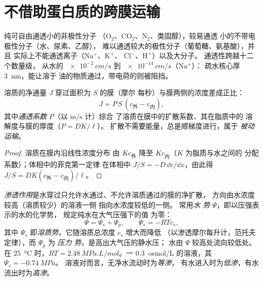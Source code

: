 \section{不借助蛋白质的跨膜运输}

\begin{proposition}[双层的通透性]\label{prop:b1:membranes-transport:permeability}
纯可自由通透小的非极性分子
（$\mathrm{O_2}$、$\mathrm{CO_2}$、$\mathrm{N_2}$、类固醇），较易通透
小的不带电极性分子（水、尿素、乙醇），
难以通透较大的极性分子（葡萄糖、氨基酸），并且
实际上不能通透离子（$\mathrm{Na^+}$、$\mathrm{K^+}$、
$\mathrm{Cl^-}$、$\mathrm{H^+}$）以及大分子。
通透性跨越十二个数量级，
从水的 $\qty{e-2}{cm/s}$ 到 $\qty{e-14}{cm/s}$（$\mathrm{Na^+}$）：
疏水核心厚 \qty{3}{nm}，能让溶于
油的物质通过，带电荷的则被阻挡。
\end{proposition}

\begin{theorem}[扩散的菲克定律]\label{thm:b1:membranes-transport:fick}
溶质的净通量 $J$ 穿过面积为 $S$ 的膜（摩尔
每秒）与膜两侧的浓度差成正比：
\[
J = P\,S\,(c_{\text{外}} - c_{\text{内}}),
\]
其中\emph{通透系数} $P$（以 \unit{m/s} 计）综合
了溶质在膜中的扩散系数、其在脂质中的
溶解度与膜的厚度（$P = DK/\ell$）。
扩散不需要能量，总是顺梯度进行，属于
\emph{被动运输}。
\end{theorem}
\begin{proof}
溶质在膜内沿线性浓度分布
由 $Kc_{\text{外}}$ 降至 $Kc_{\text{内}}$（$K$ 为脂质与水之间的
分配系数）；体相中的菲克第一定律
在体相中 $J/S = -D\,\dd c/\dd x$，由此得 $J/S = DK(c_{\text{外}} -
c_{\text{内}})/\ell$。
\end{proof}

\begin{definition}[渗透作用，水势]\label{def:b1:membranes-transport:osmosis}
\emph{渗透作用}是水穿过只允许水通过、不允许溶质通过的膜的净扩散，
方向由水浓度较高（溶质较少）的溶液一侧
指向水浓度较低的一侧。
常用\emph{水
势} $\Psi$，即以压强表示的水的化学势，
规定纯水在大气压强下的值
为零：
\[
\Psi = \Psi_s + \Psi_p, \qquad \Psi_s = -RTc_s ,
\]
其中 $\Psi_s$ 即\emph{溶质势}，它随溶质总浓度 $c_s$ 增大而降低
（以渗透摩尔每升计，范托夫定律），而 $\Psi_p$ 为
\emph{压力
势}，是高出大气压的静水压；
水由 $\Psi$ 较高处流向较低处。在
\qty{25}{\celsius} 时，$RT = \qty{2.48}{MPa.L/mol}$。一
\qty{0.3}{osmol/L} 的溶液，其 $\Psi_s = \qty{-0.74}{MPa}$。
溶液对而言，无净水流动时为\emph{等渗}，
有水进入时为\emph{低渗}，有水流出时为\emph{高渗}。
\end{definition}

